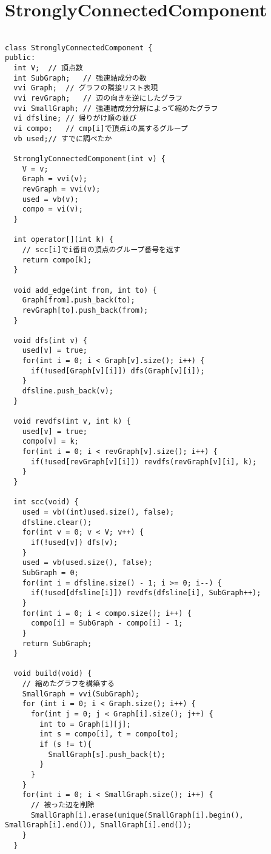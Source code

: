 \documentclass{jsarticle}
\begin{document}
\color{white}
\section{StronglyConnectedComponent}
\color{black}
\begin{lstlisting}[caption=StronglyConnectedComponent]

class StronglyConnectedComponent {
public:
  int V;  // 頂点数
  int SubGraph;   // 強連結成分の数
  vvi Graph;  // グラフの隣接リスト表現
  vvi revGraph;   // 辺の向きを逆にしたグラフ
  vvi SmallGraph; // 強連結成分分解によって縮めたグラフ
  vi dfsline; // 帰りがけ順の並び
  vi compo;   // cmp[i]で頂点iの属するグループ
  vb used;// すでに調べたか

  StronglyConnectedComponent(int v) {
    V = v;
    Graph = vvi(v);
    revGraph = vvi(v);
    used = vb(v);
    compo = vi(v);
  }

  int operator[](int k) {
    // scc[i]でi番目の頂点のグループ番号を返す
    return compo[k];
  }

  void add_edge(int from, int to) {
    Graph[from].push_back(to);
    revGraph[to].push_back(from);
  }

  void dfs(int v) {
    used[v] = true;
    for(int i = 0; i < Graph[v].size(); i++) {
      if(!used[Graph[v][i]]) dfs(Graph[v][i]);
    }
    dfsline.push_back(v);
  }

  void revdfs(int v, int k) {
    used[v] = true;
    compo[v] = k;
    for(int i = 0; i < revGraph[v].size(); i++) {
      if(!used[revGraph[v][i]]) revdfs(revGraph[v][i], k);
    }
  }

  int scc(void) {
    used = vb((int)used.size(), false);
    dfsline.clear();
    for(int v = 0; v < V; v++) {
      if(!used[v]) dfs(v);
    }
    used = vb(used.size(), false);
    SubGraph = 0;
    for(int i = dfsline.size() - 1; i >= 0; i--) {
      if(!used[dfsline[i]]) revdfs(dfsline[i], SubGraph++);
    }
    for(int i = 0; i < compo.size(); i++) {
      compo[i] = SubGraph - compo[i] - 1;
    }
    return SubGraph;
  }

  void build(void) {
    // 縮めたグラフを構築する
    SmallGraph = vvi(SubGraph);
    for (int i = 0; i < Graph.size(); i++) {
      for(int j = 0; j < Graph[i].size(); j++) {
        int to = Graph[i][j];
        int s = compo[i], t = compo[to];
        if (s != t){
          SmallGraph[s].push_back(t);
        }
      }
    }
    for(int i = 0; i < SmallGraph.size(); i++) {
      // 被った辺を削除
      SmallGraph[i].erase(unique(SmallGraph[i].begin(), SmallGraph[i].end()), SmallGraph[i].end());
    }
  }


\end{lstlisting}
\end{document}
